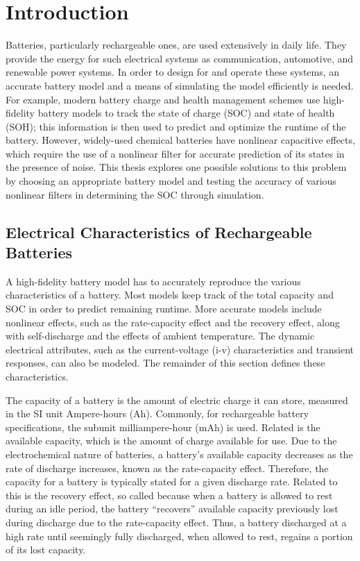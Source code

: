 \documentclass[../zhang_thesis.tex]{subfiles}
\begin{document}
\chapter{Introduction}

Batteries, particularly rechargeable ones, are used extensively in daily life. They provide the energy for such electrical systems as communication, automotive, and renewable power systems. In order to design for and operate these systems, an accurate battery model and a means of simulating the model efficiently is needed. For example, modern battery charge and health management schemes use high-fidelity battery models to track the state of charge (SOC) and state of
health (SOH); this information is then used to predict and optimize the runtime of the battery. However, widely-used chemical batteries have nonlinear capacitive effects, which require the use of a nonlinear filter for accurate prediction of its states in the presence of noise. This thesis explores one possible solutions to this problem by choosing an appropriate battery model and testing the accuracy of various nonlinear filters in determining the SOC through simulation.


\section{Electrical Characteristics of Rechargeable Batteries}

A high-fidelity battery model has to accurately reproduce the various characteristics of a battery. Most models keep track of the total capacity and SOC in order to predict remaining runtime. More accurate models include nonlinear effects, such as the rate-capacity effect and the recovery effect, along with self-discharge and the effects of ambient temperature. The dynamic electrical attributes, such as the current-voltage (i-v) characteristics and transient responses, can also be
modeled. The remainder of this section defines these characteristics.

The capacity of a battery is the amount of electric charge it can store, measured in the SI unit Ampere-hours (Ah). Commonly, for rechargeable battery specifications, the subunit milliampere-hour (mAh) is used. Related is the available capacity, which is the amount of charge available for use. Due to the electrochemical nature of batteries, a battery's available capacity decreases as the rate of discharge increases, known as the rate-capacity effect. Therefore, the capacity for a
battery is typically stated for a given discharge rate.  Related to this is the recovery effect, so called because when a battery is allowed to rest during an idle period, the battery ``recovers'' available capacity previously lost during discharge due to the rate-capacity effect. Thus, a battery discharged at a high rate until seemingly fully discharged, when allowed to rest, regains a portion of its lost capacity.
\end{document}
